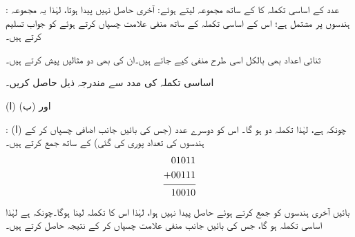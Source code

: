 :\quad 
عدد    کے  اساسی تکملہ      کا     کے ساتھ  مجموعہ     لیتے ہوئے:    آخری حاصل   نہیں    پیدا ہوتا، لہٰذا یہ مجموعہ 
    ہندسوں پر مشتمل ہے؛  اس کے اساسی تکملہ    کے ساتھ منفی  علامت چسپاں کرتے ہوئے  کو جواب تسلیم کرتے ہیں۔
\begin{center}
\begin{otherlanguage}{english}
\quad\quad
{}\quad\quad
{}\quad\quad
{}
\end{otherlanguage}
\end{center}

ثنائی اعداد بھی بالکل اسی طرح منفی کیے جاتے ہیں۔ان کی بھی دو مثالیں پیش کرتے ہیں۔
	

 اساسی تکملہ کی مدد سے مندرجہ ذیل حاصل کریں۔
 
(ا)  اور (ب) 

:\quad
(ا) چونکہ  ہے،   لہٰذا  تکملہ  دو   ہو گا۔ اس کو  دوسرے عدد   (جس کی بائیں جانب  اضافی  چسپاں کر کے   ہندسوں کی  تعداد  پوری کی گئی) کے ساتھ جمع کرتے ہیں۔
\begin{align*}
\begin{split}
01011&\\
+00111&\\
\noalign{\smallskip}\hline\noalign{\smallskip}
10010&
\end{split}
\end{align*}
بائیں آخری  ہندسوں کو جمع کرتے ہوئے  حاصل    پیدا نہیں ہوا،  لہٰذا اس کا  تکملہ   لینا ہوگا۔چونکہ   ہے لہٰذا اساسی تکملہ  ہو گا، جس کی  بائیں جانب منفی  علامت چسپاں کر کے  نتیجہ   حاصل کرتے ہیں۔


